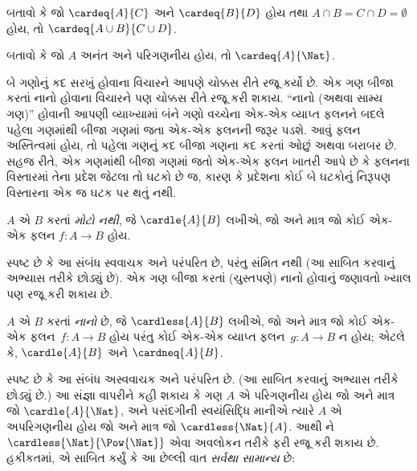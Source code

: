 \begin{prob}
બતાવો કે જો $\cardeq{A}{C}$ અને $\cardeq{B}{D}$ હોય તથા
$A \cap B = C \cap D = \emptyset$ હોય, તો
$\cardeq{A \cup B}{C \cup D}$.
\end{prob}

\begin{prob}
બતાવો કે જો $A$ અનંત અને પરિગણનીય હોય, તો
$\cardeq{A}{\Nat}$.
\end{prob}
\endgroup


\begingroup
\makeatletter{}\makeatother


\label{guunit:OLP-0036}


\begin{explain}
બે ગણોનું કદ સરખું હોવાના વિચારને આપણે ચોક્કસ રીતે રજૂ કર્યો છે.
એક ગણ બીજા કરતાં નાનો હોવાના વિચારને પણ ચોક્કસ રીતે રજૂ કરી શકાય.
“નાનો (અથવા સામ્ય ગણ)” હોવાની આપણી વ્યાખ્યામાં બંને ગણો વચ્ચેના
એક-એક વ્યાપ્ત ફલનને બદલે પહેલા ગણમાંથી બીજા ગણમાં જતા એક-એક ફલનની
જરૂર પડશે. આવું ફલન અસ્તિત્વમાં હોય, તો પહેલા ગણનું કદ બીજા
ગણના કદ કરતાં ઓછું અથવા બરાબર છે. સહજ રીતે, એક ગણમાંથી બીજા ગણમાં
જતો એક-એક ફલન ખાતરી આપે છે કે ફલનના વિસ્તારમાં તેના પ્રદેશ
જેટલા તો ઘટકો છે જ, કારણ કે પ્રદેશના કોઈ બે ઘટકોનું
નિરૂપણ વિસ્તારના એક જ ઘટક પર થતું નથી.
\end{explain}

\begin{defn}
$A$ એ $B$ કરતાં \emph{મોટો નથી}, જે $\cardle{A}{B}$ લખીએ,
જો અને માત્ર જો કોઈ એક-એક ફલન $f \colon A \to B$ હોય.
\end{defn}

સ્પષ્ટ છે કે આ સંબંધ સ્વવાચક અને પરંપરિત છે, પરંતુ સંમિત નથી
(આ સાબિત કરવાનું અભ્યાસ તરીકે છોડ્યું છે). એક ગણ બીજા કરતાં
(ચુસ્તપણે) નાનો હોવાનું જણાવતો ખ્યાલ પણ રજૂ કરી શકાય છે.

\begin{defn}
$A$ એ $B$ કરતાં \emph{નાનો} છે, જે $\cardless{A}{B}$ લખીએ,
જો અને માત્ર જો કોઈ એક-એક ફલન~$f\colon A \to B$ હોય પરંતુ
કોઈ એક-એક વ્યાપ્ત ફલન~$g\colon A \to B$ ન હોય; એટલે કે,
$\cardle{A}{B}$ અને $\cardneq{A}{B}$.
\end{defn}

સ્પષ્ટ છે કે આ સંબંધ અસ્વવાચક અને પરંપરિત છે. (આ સાબિત કરવાનું
અભ્યાસ તરીકે છોડ્યું છે.) આ સંજ્ઞા વાપરીને કહી શકાય કે ગણ $A$ એ
પરિગણનીય હોય જો અને માત્ર જો $\cardle{A}{\Nat}$, અને પસંદગીની સ્વયંસિદ્ધિ માનીએ ત્યારે $A$ એ
અપરિગણનીય હોય જો અને માત્ર જો $\cardless{\Nat}{A}$.
આથી
%
ને
$\cardless{\Nat}{\Pow{\Nat}}$ એવા અવલોકન તરીકે ફરી રજૂ
કરી શકાય છે. હકીકતમાં, \citet{Cantor1892}એ સાબિત કર્યું કે આ છેલ્લી
વાત \emph{સર્વથા સામાન્ય} છે:

